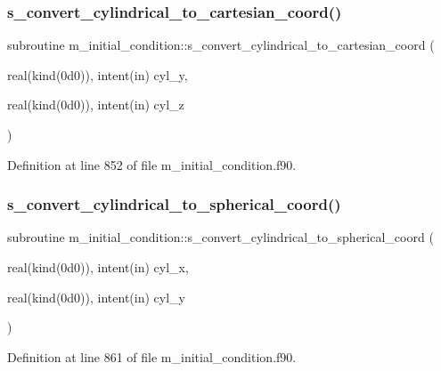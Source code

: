 \subsubsection{\texorpdfstring{s\+\_\+convert\+\_\+cylindrical\+\_\+to\+\_\+cartesian\+\_\+coord()}{s\_convert\_cylindrical\_to\_cartesian\_coord()}}
{\footnotesize\ttfamily subroutine m\+\_\+initial\+\_\+condition\+::s\+\_\+convert\+\_\+cylindrical\+\_\+to\+\_\+cartesian\+\_\+coord (\begin{DoxyParamCaption}\item[{real(kind(0d0)), intent(in)}]{cyl\+\_\+y,  }\item[{real(kind(0d0)), intent(in)}]{cyl\+\_\+z }\end{DoxyParamCaption})}



Definition at line 852 of file m\+\_\+initial\+\_\+condition.\+f90.

\mbox{\label{namespacem__initial__condition_a88d2e8debdc097d4d811fb67d6fbc880}} 
\subsubsection{\texorpdfstring{s\+\_\+convert\+\_\+cylindrical\+\_\+to\+\_\+spherical\+\_\+coord()}{s\_convert\_cylindrical\_to\_spherical\_coord()}}
{\footnotesize\ttfamily subroutine m\+\_\+initial\+\_\+condition\+::s\+\_\+convert\+\_\+cylindrical\+\_\+to\+\_\+spherical\+\_\+coord (\begin{DoxyParamCaption}\item[{real(kind(0d0)), intent(in)}]{cyl\+\_\+x,  }\item[{real(kind(0d0)), intent(in)}]{cyl\+\_\+y }\end{DoxyParamCaption})}



Definition at line 861 of file m\+\_\+initial\+\_\+condition.\+f90.

\mbox{\label{namespacem__initial__condition_a2297a9b98d2478b3594083197bd9b8b5}} 
